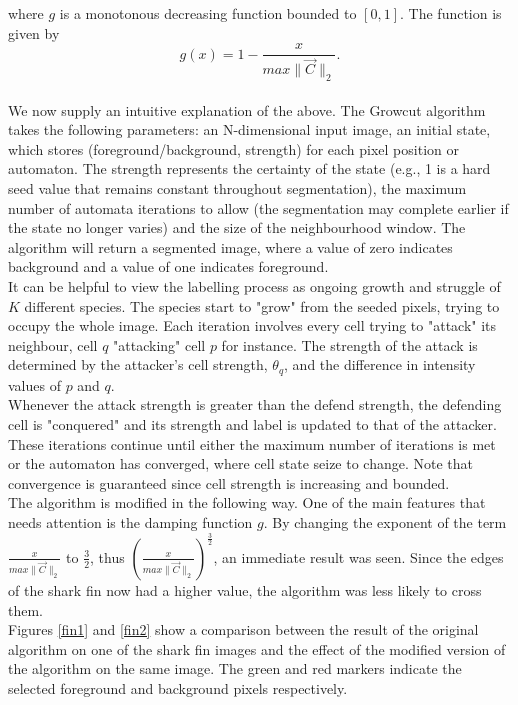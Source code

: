 \documentclass[a4paper,10pt]{article}
\begin{document}
\noindent where $g$ is a monotonous decreasing function bounded to $[0, 1]$. 
The function is given by
\[
g(x) = 1 - \frac{x}{max\| \overrightarrow{C} \|_{2}}. 
\]\\

We now supply an intuitive explanation of the above.
The Growcut algorithm takes the following parameters: an N-dimensional input image,
an initial state, which stores (foreground/background, strength) for
each pixel position or automaton.  The strength represents the
certainty of the state (e.g., 1 is a hard seed value that remains
constant throughout segmentation), the maximum number of automata iterations to allow   
(the segmentation may complete earlier if the state no longer varies) and the
size of the neighbourhood window.  The algorithm will return a segmented image, 
where a value of zero indicates background and a value of one indicates foreground. \\

It can be helpful to view the labelling process as ongoing growth and struggle of $K$ different species.
The species start to "grow" from the seeded pixels, trying to occupy the whole image.  
Each iteration involves every cell trying to "attack" its neighbour, cell $q$ "attacking" cell $p$ for instance. 
The strength of the attack is determined by the attacker's cell strength, $\theta_{q}$, and
the difference in intensity values of $p$ and $q$. \\

Whenever the attack strength is greater than the defend strength, the defending cell is "conquered" and
its strength and label is updated to that of the attacker. 
These iterations continue until either the maximum number of iterations is met or the automaton has converged,
where cell state seize to change.  Note that convergence is guaranteed since cell strength is increasing and bounded. \\

\noindent The algorithm is modified in the following way.  One of the
main features that needs attention is the damping function $g$.  By changing
the exponent of the term $\frac{x}{max\| \overrightarrow{C} \|_{2}}$ to
$\frac{3}{2}$, thus $\left ({\frac{x}{max\| \overrightarrow{C} \|_{2}}}\right
) ^\frac{3}{2}$,
an immediate result was seen.  Since the edges of the shark fin now 
  had a higher value, the algorithm was less likely to cross them. \\  
 
Figures \ref{fin1} and \ref{fin2} show a comparison between the result of the original algorithm on
one of the shark fin images and the effect of the modified version of the
algorithm on the same image.  The green and red markers indicate the selected foreground and background pixels respectively.
\end{document}
